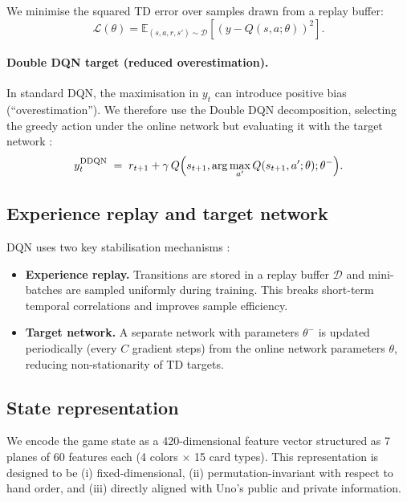 \documentclass[11pt]{article}
\begin{document}
We minimise the squared TD error over samples drawn from a replay buffer:
\begin{equation}
\mathcal{L}(\theta)=\mathbb{E}_{(s,a,r,s')\sim\mathcal{D}}\left[\left(y - Q(s,a;\theta)\right)^2\right].
\end{equation}

\paragraph{Double DQN target (reduced overestimation).}
In standard DQN, the maximisation in $y_t$ can introduce positive bias (``overestimation''). We therefore use the Double DQN decomposition, selecting the greedy action under the online network but evaluating it with the target network \parencite{vanhasselt2016double}:
\begin{equation}
  y_t^{\mathrm{DDQN}} \;=\; r_{t+1} + \gamma\,Q\Bigl(s_{t+1},\arg\max_{a'}Q(s_{t+1},a';\theta);\theta^{-}\Bigr).
\end{equation}

\subsection{Experience replay and target network}
DQN uses two key stabilisation mechanisms \parencite{mnih2015human}:
\begin{itemize}
  \item \textbf{Experience replay.} Transitions are stored in a replay buffer $\mathcal{D}$ and mini-batches are sampled uniformly during training. This breaks short-term temporal correlations and improves sample efficiency.
  \item \textbf{Target network.} A separate network with parameters $\theta^{-}$ is updated periodically (every $C$ gradient steps) from the online network parameters $\theta$, reducing non-stationarity of TD targets.
\end{itemize}

\FloatBarrier
\subsection{State representation}
We encode the game state as a 420-dimensional feature vector structured as 7 planes of 60 features each (4 colors $\times$ 15 card types). This representation is designed to be (i) fixed-dimensional, (ii) permutation-invariant with respect to hand order, and (iii) directly aligned with Uno's public and private information.
\end{document}
